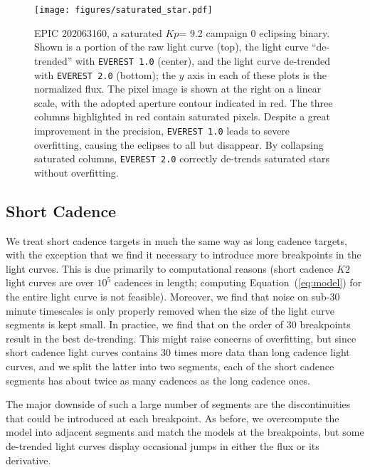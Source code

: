 \documentclass[]{emulateapj}
\newcommand{\Kp}{\ensuremath{Kp}}
\begin{document}
\begin{figure}[hbt]
  \begin{center}
      \texttt{[image: figures/saturated\_star.pdf]}
       \caption{EPIC 202063160, a saturated \Kp = 9.2 campaign 0 eclipsing
       binary. Shown is a portion of the raw light curve (top), the light curve ``de-trended''
       with \texttt{EVEREST 1.0} (center), and the light curve de-trended with \texttt{EVEREST 2.0}
       (bottom); the $y$ axis in each of these plots is the normalized flux.
       The pixel image is shown at the right on a linear scale, with the adopted aperture
       contour indicated in red. The three columns highlighted in red contain saturated
       pixels. Despite a great improvement in the precision, \texttt{EVEREST 1.0} leads to severe
       overfitting, causing the eclipses to all but disappear. By collapsing saturated columns,
       \texttt{EVEREST 2.0} correctly de-trends saturated stars without overfitting.}
     \label{fig:saturated_star}
  \end{center}
\end{figure}

\subsection{Short Cadence}
\label{sec:impl_shortcad}
We treat short cadence targets in much the same way as long cadence targets, with the exception
that we find it necessary to introduce more breakpoints in the light curves. This is
due primarily to computational reasons (short cadence $K2$ light curves are over $10^5$ cadences
in length; computing Equation~(\ref{eq:model}) for the entire light curve is not feasible).
Moreover, we find that noise on sub-30 minute timescales is only properly removed when
the size of the light curve segments is kept small. In practice, we find that on the order of
30 breakpoints result in the best de-trending. This might raise concerns of overfitting, but
since short cadence light curves contains 30 times more data than long cadence light curves,
and we split the latter into two segments, each of the short cadence segments has about twice
as many cadences as the long cadence ones.

The major downside of such a large number of segments are the discontinuities that could
be introduced at each breakpoint. As before, we overcompute the model into adjacent
segments and match the models at the breakpoints, but some de-trended light curves display
occasional jumps in either the flux or its derivative.
\end{document}
